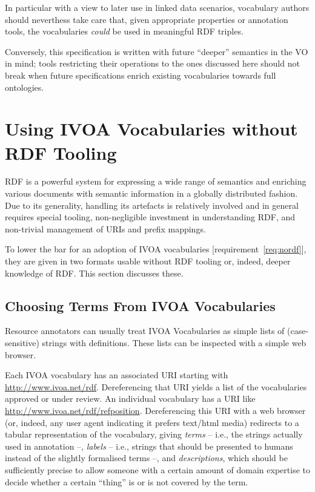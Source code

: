 \documentclass[11pt,a4paper]{ivoa}
\begin{document}
In particular with a view to later use in linked data scenarios,
vocabulary authors should neverthess take care that, given appropriate
properties or annotation tools, the vocabularies \emph{could} be used in
meaningful RDF triples.

Conversely, this specification is written with future ``deeper''
semantics in the VO in mind; tools restricting their operations to the ones
discussed here should not break when future specifications enrich
existing vocabularies towards full ontologies.


\section{Using IVOA Vocabularies without RDF Tooling}
\label{sect:withoutrdf}

RDF is a
powerful system for expressing a wide range of semantics and enriching
various documents with semantic information in a globally distributed
fashion.  Due to its generality, handling its artefacts is relatively
involved and in general requires special tooling, non-negligible
investment in understanding RDF, and non-trivial management of URIs and
prefix mappings.

To lower the bar for an adoption of IVOA vocabularies
[requirement~\ref{req:nordf}], they are given in
two formats usable without RDF tooling or, indeed, deeper knowledge of
RDF.  This section discusses these.

\subsection{Choosing Terms From IVOA Vocabularies}

Resource annotators can usually treat IVOA Vocabularies as simple lists
of (case-sensitive) strings with definitions.  These lists can be
inspected with a simple web browser.

Each IVOA vocabulary has an associated URI starting with
\url{http://www.ivoa.net/rdf}.  Dereferencing that URI yields a list of
the vocabularies approved or under review.  An individual vocabulary has a
URI like \url{http://www.ivoa.net/rdf/refposition}.  Dereferencing this URI
with a web browser (or, indeed, any user agent indicating it prefers
text/html media) redirects to a tabular representation of the vocabulary,
giving \emph{terms} -- i.e., the strings actually used in annotation --,
\emph{labels} -- i.e., strings that should be presented to humans instead of
the slightly formalised terms --, and \emph{descriptions}, which should
be sufficiently precise to allow someone with a certain amount
of domain expertise to decide whether a certain ``thing'' is or is not
covered by the term.
\end{document}
